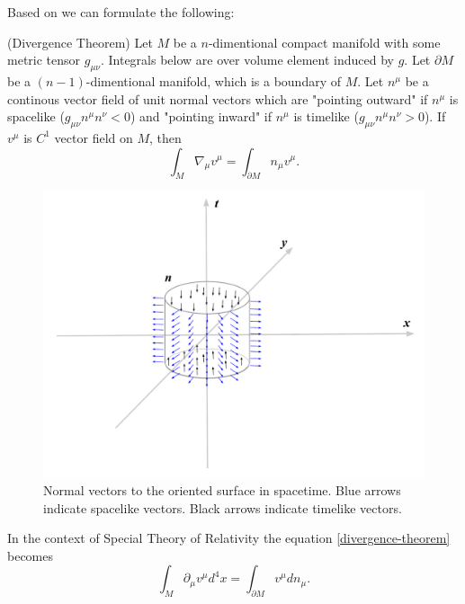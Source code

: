 \documentclass[main.tex]{subfiles}
\begin{document}
Based on \cite[see][Appendix B]{wald1984} we can formulate the following:
\begin{theorem}
\label{guass-theorem-relativistic-4} (Divergence Theorem)
Let $M$ be a $n$-dimentional compact manifold with some metric tensor $g_{\mu\nu}$. Integrals below are over volume element induced by $g$. Let $\partial M$ be a $(n-1)$-dimentional manifold, which is a boundary of $M$. Let $n^\mu$ be a continous vector field of unit normal vectors which are "pointing outward" if $n^\mu$ is spacelike ($g_{\mu\nu}n^\mu n^\nu < 0$) and "pointing inward" if $n^\mu$ is timelike ($g_{\mu\nu}n^\mu n^\nu > 0$). If $v^\mu$ is $C^1$ vector field on $M$, then 
\begin{equation}
\label{divergence-theorem}
\int_M \nabla_\mu v^\mu = \int_{\partial M} n_\mu v^\mu.
\end{equation}
\end{theorem}
\begin{figure}[H]
\centering
\includegraphics[scale=0.5]{figs/SpaceTimeNormal}
\caption{Normal vectors to the oriented surface in spacetime. Blue arrows indicate spacelike vectors. Black arrows indicate timelike vectors.}
\end{figure}

In the context of Special Theory of Relativity the equation \ref{divergence-theorem} becomes
\begin{equation}
\label{divergence-theorem-special}
\int_M \partial_\mu v^\mu d^4 x = \int_{\partial M} v^\mu dn_\mu.
\end{equation} 
\end{document}
